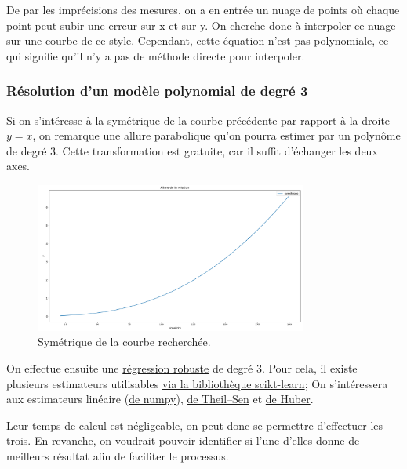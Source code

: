 \documentclass[12pt]{article}
\begin{document}
    De par les imprécisions des mesures, on a en entrée un nuage de points où chaque point peut subir une erreur sur x et sur y. On cherche donc à interpoler ce nuage sur une courbe de ce style. Cependant, cette équation n'est pas polynomiale, ce qui signifie qu'il n'y a pas de méthode directe pour interpoler.

\subsubsection{Résolution d'un modèle polynomial de degré 3}

    Si on s'intéresse à la symétrique de la courbe précédente par rapport à la droite $y = x$, on remarque une allure parabolique qu'on pourra estimer par un polynôme de degré 3. Cette transformation est gratuite, car il suffit d'échanger les deux axes.

    \begin{figure}[ht!]
        \centering
        \includegraphics[width=0.8\textwidth]{Images/Relation_AllureSym.png}  
        \caption{Symétrique de la courbe recherchée.}
    \end{figure}

    On effectue ensuite une \href{https://fr.statisticseasily.com/glossario/what-is-robust-regression/}{régression robuste} de degré 3. Pour cela, il existe plusieurs estimateurs utilisables \href{https://fr.statisticseasily.com/glossario/what-is-robust-regression/}{via la bibliothèque scikt-learn}; On s'intéressera aux estimateurs linéaire (\href{https://www.w3schools.com/PYTHON/python_ml_polynomial_regression.asp}{de numpy}), \href{https://en.wikipedia.org/wiki/Theil%E2%80%93Sen_estimator}{de Theil–Sen} et 
    \href{https://en.wikipedia.org/wiki/Huber_loss}{de Huber}.

    Leur temps de calcul est négligeable, on peut donc se permettre d'effectuer les trois. En revanche, on voudrait pouvoir identifier si l'une d'elles donne de meilleurs résultat afin de faciliter le processus.
    
\end{document}
